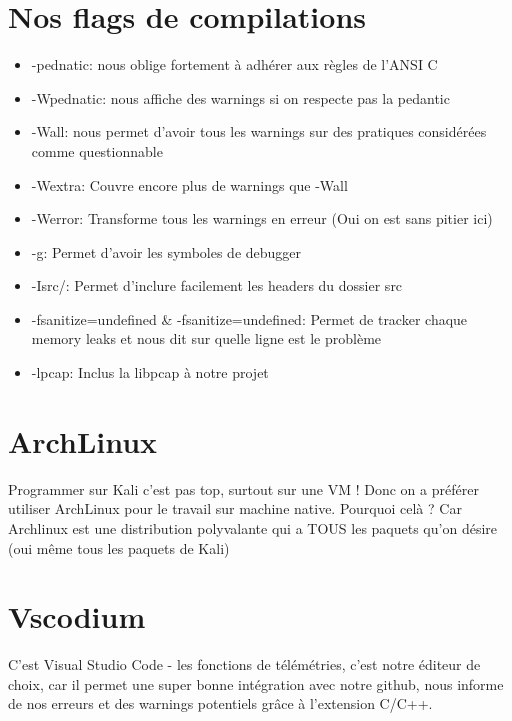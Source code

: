 \documentclass[a4paper]{report}
\begin{document}
\section{Nos flags de compilations}
\label{sec:orgacd67b3}
\begin{itemize}
\item -pednatic: nous oblige fortement à adhérer aux règles de l'ANSI C
\item -Wpednatic: nous affiche des warnings si on respecte pas la pedantic
\item -Wall: nous permet d'avoir tous les warnings sur des pratiques considérées comme questionnable
\item -Wextra: Couvre encore plus de warnings que -Wall
\item -Werror: Transforme tous les warnings en erreur (Oui on est sans pitier ici)
\item -g: Permet d'avoir les symboles de debugger
\item -Isrc/: Permet d'inclure facilement les headers du dossier src
\item -fsanitize=undefined \& -fsanitize=undefined: Permet de tracker chaque memory leaks et nous dit sur quelle ligne est le problème
\item -lpcap: Inclus la libpcap à notre projet
\end{itemize}

\section{ArchLinux}
\label{sec:orgcff1eca}
Programmer sur Kali c'est pas top, surtout sur une VM ! Donc on a préférer utiliser ArchLinux pour le travail sur machine native.
Pourquoi celà ? Car Archlinux est une distribution polyvalante qui a TOUS les paquets qu'on désire (oui même tous les paquets de Kali)
\section{Vscodium}
\label{sec:orga96acb4}
C'est Visual Studio Code - les fonctions de télémétries, c'est notre éditeur de choix, car il permet une super bonne intégration avec notre github,
nous informe de nos erreurs et des warnings potentiels grâce à l'extension C/C++.
\end{document}
